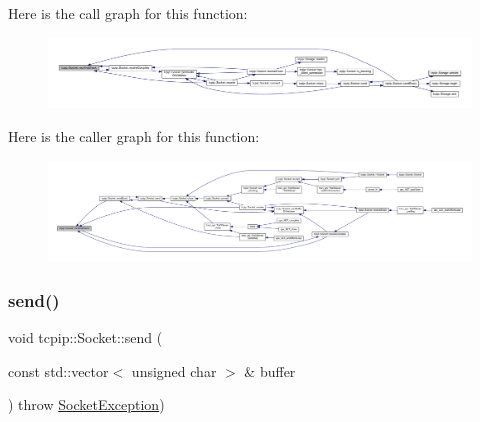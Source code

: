 Here is the call graph for this function\+:\nopagebreak
\begin{figure}[H]
\begin{center}
\leavevmode
\includegraphics[width=350pt]{classtcpip_1_1_socket_a30a24c05b20d9c3ec54239e75268cda8_cgraph}
\end{center}
\end{figure}
Here is the caller graph for this function\+:\nopagebreak
\begin{figure}[H]
\begin{center}
\leavevmode
\includegraphics[width=350pt]{classtcpip_1_1_socket_a30a24c05b20d9c3ec54239e75268cda8_icgraph}
\end{center}
\end{figure}
\mbox{\label{classtcpip_1_1_socket_acb91f20e7a532159a8daa2796fa4abd4}} 
\subsubsection{\texorpdfstring{send()}{send()}}
{\footnotesize\ttfamily void tcpip\+::\+Socket\+::send (\begin{DoxyParamCaption}\item[{const std\+::vector$<$ unsigned char $>$ \&}]{buffer }\end{DoxyParamCaption}) throw  \hyperlink{classtcpip_1_1_socket_exception}{Socket\+Exception}) }

